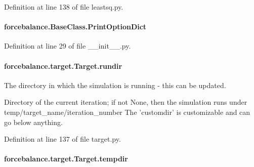 Definition at line 138 of file leastsq.\-py.

\hypertarget{classforcebalance_1_1BaseClass_afc6659278497d7245bc492ecf405ccae}{
\paragraph[{Print\-Option\-Dict}]{\setlength{\rightskip}{0pt plus 5cm}forcebalance.\-Base\-Class.\-Print\-Option\-Dict\hspace{0.3cm}{\ttfamily [inherited]}}}\label{classforcebalance_1_1BaseClass_afc6659278497d7245bc492ecf405ccae}


Definition at line 29 of file \-\_\-\-\_\-init\-\_\-\-\_\-.\-py.

\hypertarget{classforcebalance_1_1target_1_1Target_a6872de5b2d4273b82336ea5b0da29c9e}{
\paragraph[{rundir}]{\setlength{\rightskip}{0pt plus 5cm}forcebalance.\-target.\-Target.\-rundir\hspace{0.3cm}{\ttfamily [inherited]}}}\label{classforcebalance_1_1target_1_1Target_a6872de5b2d4273b82336ea5b0da29c9e}


The directory in which the simulation is running -\/ this can be updated. 

Directory of the current iteration; if not None, then the simulation runs under temp/target\-\_\-name/iteration\-\_\-number The 'customdir' is customizable and can go below anything.

Definition at line 137 of file target.\-py.

\hypertarget{classforcebalance_1_1target_1_1Target_aa1f01b5b78db253b5b66384ed11ed193}{
\paragraph[{tempdir}]{\setlength{\rightskip}{0pt plus 5cm}forcebalance.\-target.\-Target.\-tempdir\hspace{0.3cm}{\ttfamily [inherited]}}}\label{classforcebalance_1_1target_1_1Target_aa1f01b5b78db253b5b66384ed11ed193}


